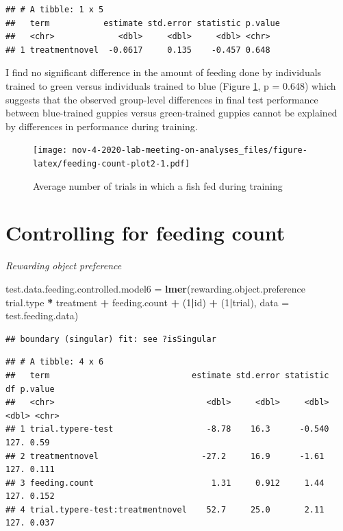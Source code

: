 \documentclass[]{book}
\newenvironment{Shaded}{\begin{snugshade}}{\end{snugshade}}
\newcommand{\KeywordTok}[1]{\textcolor[rgb]{0.13,0.29,0.53}{\textbf{#1}}}
\newcommand{\DataTypeTok}[1]{\textcolor[rgb]{0.13,0.29,0.53}{#1}}
\newcommand{\DecValTok}[1]{\textcolor[rgb]{0.00,0.00,0.81}{#1}}
\newcommand{\StringTok}[1]{\textcolor[rgb]{0.31,0.60,0.02}{#1}}
\newcommand{\OperatorTok}[1]{\textcolor[rgb]{0.81,0.36,0.00}{\textbf{#1}}}
\newcommand{\NormalTok}[1]{#1}
\begin{document}
\begin{verbatim}
## # A tibble: 1 x 5
##   term           estimate std.error statistic p.value
##   <chr>             <dbl>     <dbl>     <dbl> <chr>  
## 1 treatmentnovel  -0.0617     0.135    -0.457 0.648
\end{verbatim}

I find no significant difference in the amount of feeding done by
individuals trained to green versus individuals trained to blue (Figure
\ref{fig:feeding-count-plot2}, p = 0.648) which suggests that the
observed group-level differences in final test performance between
blue-trained guppies versus green-trained guppies cannot be explained by
differences in performance during training.

\begin{figure}
\centering
\texttt{[image: nov-4-2020-lab-meeting-on-analyses\_files/figure-latex/feeding-count-plot2-1.pdf]}
\caption{\label{fig:feeding-count-plot2}Average number of trials in which a
fish fed during training}
\end{figure}

\chapter{Controlling for feeding
count}\label{controlling-for-feeding-count}

\emph{Rewarding object preference}

\begin{Shaded}
\begin{Highlighting}[]
\NormalTok{test.data.feeding.controlled.model6 =}\StringTok{ }
\StringTok{  }\KeywordTok{lmer}\NormalTok{(rewarding.object.preference }\OperatorTok{~}\StringTok{ }\NormalTok{trial.type }\OperatorTok{*}\StringTok{ }\NormalTok{treatment }\OperatorTok{+}\StringTok{ }\NormalTok{feeding.count }\OperatorTok{+}\StringTok{ }\NormalTok{(}\DecValTok{1}\OperatorTok{|}\NormalTok{id) }\OperatorTok{+}\StringTok{ }\NormalTok{(}\DecValTok{1}\OperatorTok{|}\NormalTok{trial), }
       \DataTypeTok{data =}\NormalTok{ test.feeding.data)}
\end{Highlighting}
\end{Shaded}

\begin{verbatim}
## boundary (singular) fit: see ?isSingular
\end{verbatim}

\begin{verbatim}
## # A tibble: 4 x 6
##   term                             estimate std.error statistic    df p.value
##   <chr>                               <dbl>     <dbl>     <dbl> <dbl> <chr>  
## 1 trial.typere-test                   -8.78    16.3      -0.540  127. 0.59   
## 2 treatmentnovel                     -27.2     16.9      -1.61   127. 0.111  
## 3 feeding.count                        1.31     0.912     1.44   127. 0.152  
## 4 trial.typere-test:treatmentnovel    52.7     25.0       2.11   127. 0.037
\end{verbatim}
\end{document}
